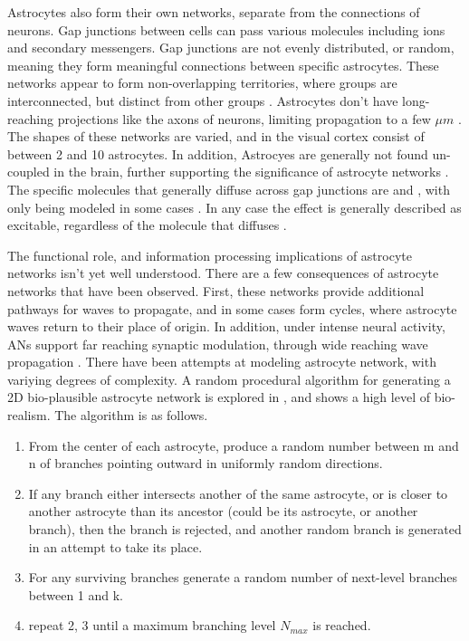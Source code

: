     Astrocytes also form their own networks, separate from the connections of
    neurons. Gap junctions between cells can pass various molecules including
    ions and secondary messengers. Gap junctions are not evenly distributed, or
    random, meaning they form meaningful connections between specific
    astrocytes. These networks appear to form non-overlapping territories, where
    groups are interconnected, but distinct from other
    groups \parencite{mederos_2018}. Astrocytes don't have long-reaching
    projections like the axons of neurons, limiting \ca propagation to a few
    $\mu m$ \parencite{hofer_2002}. The shapes of these networks are varied,
    and in the visual cortex consist of between 2 and 10 astrocytes. In
    addition, Astrocyes are generally not found un-coupled in the brain, further
    supporting the significance of astrocyte networks \parencite{postnov_2009}. The
    specific molecules that generally diffuse across gap junctions are \ipt and
    \ca, with only \ipt being modeled in some cases \parencite{pitta_2012}. In any
    case the effect is generally described as excitable, regardless of the
    molecule that diffuses \parencite{gordleeva_2021, pitta_2012, postnov_2009}.

    The functional role, and information processing implications of astrocyte
    networks isn't yet well understood. There are a few consequences of
    astrocyte networks that have been observed. First, these networks provide
    additional pathways for \ca waves to propagate, and in some cases form
    cycles, where astrocyte waves return to their place of origin. In addition,
    under intense neural activity, ANs support far reaching synaptic modulation,
    through wide reaching \ca wave propagation \parencite{postnov_2009}. There
    have been attempts at modeling astrocyte network, with variying degrees of
    complexity. A random procedural algorithm for generating a 2D bio-plausible
    astrocyte network is explored in \parencite{postnov_2009}, and shows a high
    level of bio-realism. The algorithm is as follows.

    \begin{enumerate}
        \item From the center of each astrocyte, produce a random number between
          m and n of branches pointing outward in uniformly random directions.
        \item If any branch either intersects another of the same astrocyte, or
          is closer to another astrocyte than its ancestor (could be its
          astrocyte, or another branch), then the branch is rejected, and
          another random branch is generated in an attempt to take its place.
        \item For any surviving branches generate a random number of next-level
          branches between 1 and k.
        \item repeat 2, 3 until a maximum branching level $N_{max}$ is reached.
    \end{enumerate}

